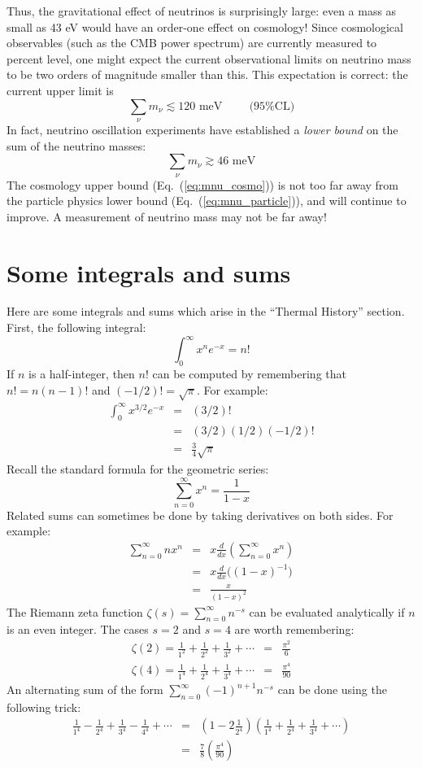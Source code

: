 \documentclass[aps,prd,superscriptaddress,groupedaddress,nofootinbib,nobibnotes]{revtex4}
\newcommand{\be}{\begin{equation}}
\newcommand{\ee}{\end{equation}}
\newcommand{\ba}{\begin{eqnarray}}
\newcommand{\ea}{\end{eqnarray}}
\newcommand{\nn}{\nonumber}
\begin{document}
\begin{itemize}
Thus, the gravitational effect of neutrinos is surprisingly large: even a mass as small
as 43 eV would have an order-one effect on cosmology!  Since cosmological observables
(such as the CMB power spectrum) are currently measured to percent level, one might
expect the current observational limits on neutrino mass to be two orders of magnitude
smaller than this.  This expectation is correct: the current upper limit is
\be
\sum_\nu m_\nu \lesssim 120 \mbox{ meV} \hspace{1cm} \mbox{(95\% CL)}  \label{eq:mnu_cosmo}
\ee
In fact, neutrino oscillation experiments have established a {\em lower bound} 
on the sum of the neutrino masses:
\be
\sum_\nu m_\nu \gtrsim 46 \mbox{ meV}  \label{eq:mnu_particle}
\ee
The cosmology upper bound (Eq.~(\ref{eq:mnu_cosmo})) is not too far away from the
particle physics lower bound (Eq.~(\ref{eq:mnu_particle})), and will continue to
improve.  A measurement of neutrino mass may not be far away!


\end{itemize}

\appendix

\section{Some integrals and sums}

\par\noindent
Here are some integrals and sums which arise in the ``Thermal History'' section.
First, the following integral:
\be
\int_0^\infty x^n e^{-x} = n!  \label{eq:gamma}
\ee
If $n$ is a half-integer, then $n!$ can be computed by remembering that
$n! = n (n-1)!$ and $(-1/2)! = \sqrt{\pi}$.  For example:
\ba
\int_0^\infty x^{3/2} e^{-x} 
 &=& (3/2)! \nn \\
 &=& (3/2) (1/2) (-1/2)! \nn \\
 &=& \frac{3}{4} \sqrt{\pi}
\ea
Recall the standard formula for the geometric series:
\be
\sum_{n=0}^\infty x^n = \frac{1}{1-x}  \label{eq:geom_series}
\ee
Related sums can sometimes be done by taking derivatives on both sides.  For example:
\ba
\sum_{n=0}^\infty n x^n 
 &=& x \frac{d}{dx} \left( \sum_{n=0}^\infty x^n \right) \nn \\
 &=& x \frac{d}{dx} \Big( (1-x)^{-1} \Big) \nn \\
 &=& \frac{x}{(1-x)^2}  \label{eq:geom_series2}
\ea
The Riemann zeta function $\zeta(s) = \sum_{n=0}^\infty n^{-s}$ can be evaluated
analytically if $n$ is an even integer.  The cases $s=2$ and $s=4$ are worth remembering:
\ba
\zeta(2) = \frac{1}{1^2} + \frac{1}{2^2} + \frac{1}{3^2} + \cdots &=& \frac{\pi^2}{6} \\
\zeta(4) = \frac{1}{1^4} + \frac{1}{2^4} + \frac{1}{3^4} + \cdots &=& \frac{\pi^4}{90}  \label{eq:zeta4}
\ea
An alternating sum of the form $\sum_{n=0}^\infty (-1)^{n+1} n^{-s}$ can be done using
the following trick:
\ba
\frac{1}{1^4} - \frac{1}{2^4} + \frac{1}{3^4} - \frac{1}{4^4} + \cdots 
  &=& \left( 1 - 2 \frac{1}{2^4} \right) \left( \frac{1}{1^4} + \frac{1}{2^4} + \frac{1}{3^4} + \cdots \right) \nn \\
  &=& \frac{7}{8} \left( \frac{\pi^4}{90} \right)  \label{eq:zeta4a}
\ea
\end{document}
